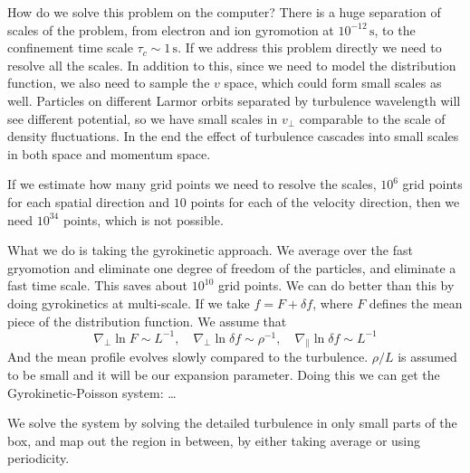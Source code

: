 \documentclass[letterpaper, 11pt]{article}
\numberwithin{equation}{section}
\numberwithin{figure}{section}
\begin{document}
How do we solve this problem on the computer? There is a huge separation of
scales of the problem, from electron and ion gyromotion at
$10^{-12}\,\mathrm{s}$, to the confinement time scale $\tau_{c}\sim
1\,\mathrm{s}$. If we address this problem directly we need to resolve all the
scales. In addition to this, since we need to model the distribution function,
we also need to sample the $v$ space, which could form small scales as well.
Particles on different Larmor orbits separated by turbulence wavelength will see
different potential, so we have small scales in $v_{\perp}$ comparable to the
scale of density fluctuations. In the end the effect of turbulence cascades into
small scales in both space and momentum space.

If we estimate how many grid points we need to resolve the scales, $10^6$ grid
points for each spatial direction and $10$ points for each of the velocity
direction, then we need $10^{34}$ points, which is not possible.

What we do is taking the gyrokinetic approach. We average over the fast
gryomotion and eliminate one degree of freedom of the particles, and eliminate a
fast time scale. This saves about $10^{10}$ grid points. We can do better than
this by doing gyrokinetics at multi-scale. If we take $f = F + \delta f$, where
$F$ defines the mean piece of the distribution function. We assume that
\begin{equation}
  \label{eq:33}
  \nabla_{\perp}\ln F \sim L^{-1},\quad \nabla_{\perp} \ln \delta f \sim \rho^{-1},\quad \nabla_{\parallel}\ln \delta f \sim L^{-1}
\end{equation}
And the mean profile evolves slowly compared to the turbulence. $\rho/L$ is
assumed to be small and it will be our expansion parameter. Doing this we can
get the Gyrokinetic-Poisson system: \dots

We solve the system by solving the detailed turbulence in only small parts of
the box, and map out the region in between, by either taking average or using
periodicity.
\end{document}
